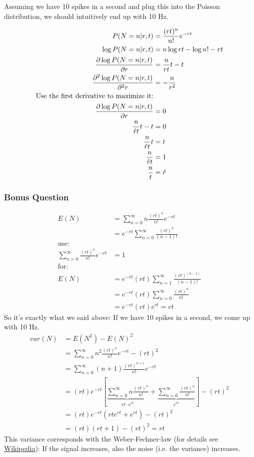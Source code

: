 \documentclass[../main/Notes.tex]{subfiles}
\begin{document}
Assuming we have 10 spikes in a second and plug this into the Poisson distribution, we should intuitively end up with 10 Hz.

\begin{align*}\index{Maximum likelihood}
P(N=n|r,t) &= \frac{(rt)^n}{n!} e^{-rt} \\
\log{P(N=n|r,t)} &= n \log{rt} - \log{n!} - rt \\
\frac{\partial\log{P(N=n|r,t)}}{\partial r} &= \frac{n}{rt}t-t \\
\frac{\partial^2\log{P(N=n|r,t)}}{\partial^2 r} &= -\frac{n}{r^2} \\
\text{Use the first derivative to maximize it:}\\
\frac{\partial\log{P(N=n|r,t)}}{\partial r} &= 0 \\
\frac{n}{\est{r}t}t-t &= 0 \\
\frac{n}{\est{r}t}t &= t \\
\frac{n}{\est{r}t} &= 1 \\
\frac{n}{t} &= \est{r}
\end{align*}

\subsubsection*{Bonus Question}
\begin{align*}
E(N) &= \sum_{n=0}^\infty{n \frac{(rt)^n}{n!} e^{-rt}} \\
     &= e^{-rt} \sum_{n=0}^\infty{\frac{(rt)^n}{(n-1)!}} \\
\text{use:}&\\
\sum_{n=0}^\infty{\frac{(rt)^n}{n!} e^{-rt}} &= 1 \\
\text{for:}&\\
E(N) &= e^{-rt} (rt) \sum_{n=1}^\infty{\frac{(rt)^{(n-1)}}{(n-1)!}} \\
     &= e^{-rt} (rt) \sum_{n=0}^\infty{\frac{(rt)^{n}}{n!}} \\
     &= e^{-rt} (rt) e^{rt} = rt
\end{align*}
So it's exactly what we said above: If we have 10 spikes in a second, we come up with 10 Hz.
\begin{align*}
var(N) &= E(N^2)-E(N)^2 \\
       &= \sum_{n=0}^\infty{n^2 \frac{(rt)^n}{n!} e^{-rt}} - (rt)^2 \\
       &= \sum_{n=0}^\infty{(n+1) \frac{(rt)^{n+1}}{n!} e^{-rt}} \\
       &= (rt)e^{-rt}\left[ \underbrace{ \sum_{n=0}^\infty{n \frac{(rt)^n}{n!}} }_{rt\cdot e^{rt}} +  \underbrace{ \sum_{n=0}^\infty{\frac{(rt)^n}{n!}} }_{e^{rt}} \right] - (rt)^2 \\
       &= (rt)e^{-rt}\left(rt e^{rt}+e^{rt}\right) - (rt)^2 \\
       &= (rt)(rt+1)-(rt)^2 = rt
\end{align*}
This variance corresponds with the Weber-Fechner-law (for details see \href{http://en.wikipedia.org/wiki/Weber-Fechner_law}{Wikipedia}): If the signal increases, also the noise (i.e. the variance) increases.
\end{document}
